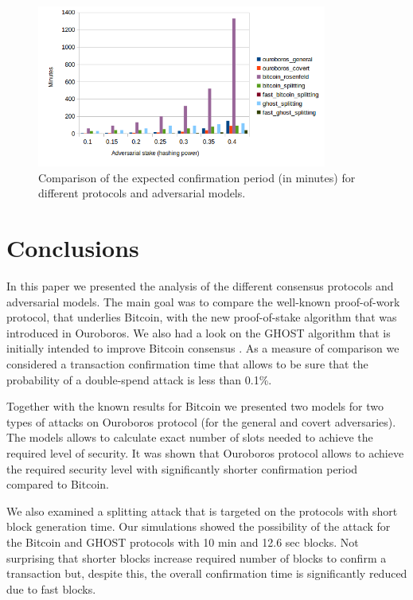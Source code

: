 \documentclass[10pt,a4paper]{article}
\numberwithin{equation}{section} %
\theoremstyle{plain}
\theoremstyle{definition}
\theoremstyle{remark}
\begin{document}
    \begin{figure}[h!] 
        \centering
        \includegraphics[width=0.85\textwidth]{time_comparison}
        \caption{Comparison of the expected confirmation period (in minutes) for different protocols and adversarial models.}
        \label{fig:time_comparison}
    \end{figure}
	
	\section{Conclusions}
	
	In this paper we presented the analysis of the different consensus protocols and adversarial models. The main goal was to compare the well-known proof-of-work protocol, that underlies Bitcoin, with the new proof-of-stake algorithm that was introduced in Ouroboros. We also had a look on the GHOST algorithm that is initially intended to improve Bitcoin consensus . As a measure of comparison we considered a transaction confirmation time that allows to be sure that the probability of a double-spend attack is less than 0.1\%.
	
	Together with the known results for Bitcoin we presented two models for two types of attacks on Ouroboros protocol (for the general and covert adversaries). The models allows to calculate exact number of slots needed to achieve the required level of security. It was shown that Ouroboros protocol allows to achieve the required security level with significantly shorter confirmation period compared to Bitcoin.
	
	We also examined a splitting attack that is targeted on the protocols with short block generation time. Our simulations showed the possibility of the attack for the Bitcoin and GHOST protocols with 10 min and 12.6 sec blocks. Not surprising that shorter blocks increase required number of blocks to confirm a transaction but, despite this, the overall confirmation time is significantly reduced due to fast blocks.
	    
\end{document}
